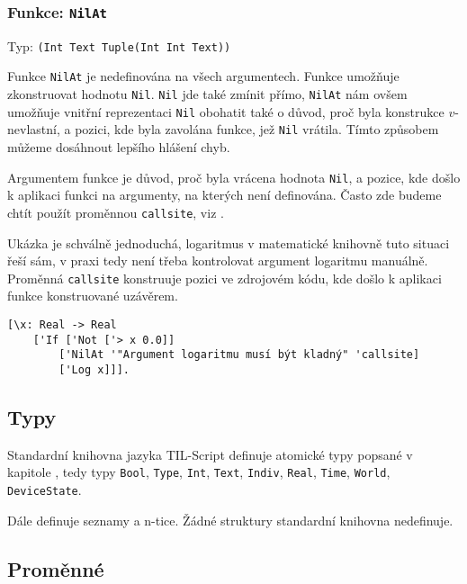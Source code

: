 \subsubsection*{Funkce: \lstinline{NilAt}}\label{nilat-fn}
Typ: \lstinline{(Int Text Tuple(Int Int Text))}

Funkce \lstinline{NilAt} je nedefinována na všech argumentech. Funkce umožňuje zkonstruovat hodnotu
\lstinline{Nil}. \lstinline{Nil} jde také zmínit přímo, \lstinline{NilAt} nám ovšem umožňuje vnitřní
reprezentaci \lstinline{Nil} obohatit také o důvod, proč byla konstrukce $v$-nevlastní, a pozici,
kde byla zavolána funkce, jež \lstinline{Nil} vrátila. Tímto způsobem můžeme dosáhnout lepšího
hlášení chyb.

Argumentem funkce je důvod, proč byla vrácena hodnota \lstinline{Nil}, a pozice, kde došlo
k aplikaci funkci na argumenty, na kterých není definována. Často zde budeme chtít použít proměnnou
\lstinline{callsite}, viz .

Ukázka je schválně jednoduchá, logaritmus v matematické knihovně tuto situaci řeší sám, v praxi tedy
není třeba kontrolovat argument logaritmu manuálně. Proměnná \lstinline{callsite} konstruuje
pozici ve zdrojovém kódu, kde došlo k aplikaci funkce konstruované uzávěrem.

\begin{lstlisting}[caption={Ukázka využití NilAt}]
[\x: Real -> Real
    ['If ['Not ['> x 0.0]]
        ['NilAt '"Argument logaritmu musí být kladný" 'callsite]
        ['Log x]]].
\end{lstlisting}


\subsection{Typy}

Standardní knihovna jazyka TIL-Script definuje atomické typy popsané v kapitole
, tedy typy
\lstinline{Bool}, \lstinline{Type}, \lstinline{Int}, \lstinline{Text}, \lstinline{Indiv},
\lstinline{Real}, \lstinline{Time}, \lstinline{World}, \lstinline{DeviceState}.

Dále definuje seznamy a n-tice. Žádné struktury standardní knihovna nedefinuje.

\subsection{Proměnné}

